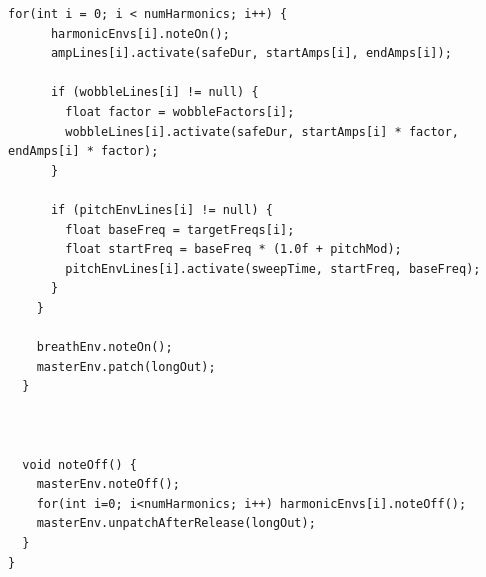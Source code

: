 \begin{lstlisting}[caption={Horn.pde}, label={lst:proc_horn}]
    for(int i = 0; i < numHarmonics; i++) {
      harmonicEnvs[i].noteOn();
      ampLines[i].activate(safeDur, startAmps[i], endAmps[i]);
      
      if (wobbleLines[i] != null) {
        float factor = wobbleFactors[i];
        wobbleLines[i].activate(safeDur, startAmps[i] * factor, endAmps[i] * factor);
      }
      
      if (pitchEnvLines[i] != null) {
        float baseFreq = targetFreqs[i];
        float startFreq = baseFreq * (1.0f + pitchMod);
        pitchEnvLines[i].activate(sweepTime, startFreq, baseFreq);
      }
    }
    
    breathEnv.noteOn();
    masterEnv.patch(longOut); 
  }
  
  
  
  void noteOff() {
    masterEnv.noteOff();
    for(int i=0; i<numHarmonics; i++) harmonicEnvs[i].noteOff();
    masterEnv.unpatchAfterRelease(longOut); 
  }
}
\end{lstlisting}

